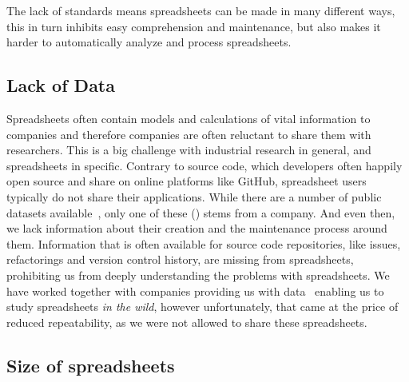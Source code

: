 \documentclass[conference]{IEEEtran}
\begin{document}
The lack of standards means spreadsheets can be made in many different ways, this in turn inhibits easy comprehension and maintenance, but also makes it harder to automatically analyze and process spreadsheets.

\subsection{Lack of Data}
Spreadsheets often contain models and calculations of vital information to companies and therefore companies are often reluctant to share them with researchers. This is a big challenge with industrial research in general, and spreadsheets in specific. Contrary to source code, which developers often happily open source and share on online platforms like GitHub, spreadsheet users typically do not share their applications. While there are a number of public datasets available~\cite{fisher_euses_2005, Hermans2015, conf/msr/BarikLSSM15}, only one of these (\cite{Hermans2015}) stems from a company. And even then, we lack information about their creation and the maintenance process around them. Information that is often available for source code repositories, like issues, refactorings and version control history, are missing from spreadsheets, prohibiting us from deeply understanding the problems with spreadsheets. We have worked together with companies providing us with data~\cite{hermans_supporting_2011, hermans_detecting_2012, hermans_detecting_2012-1, hermans_detecting_2014, Jansen2015} enabling us to study spreadsheets \emph{in the wild}, however unfortunately, that came at the price of reduced repeatability, as we were not allowed to share these spreadsheets.

\subsection{Size of spreadsheets}
\end{document}
